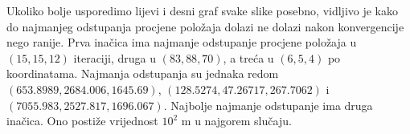 \documentclass[a4paper,twoside,12pt]{memoir} %
\begin{document}
Ukoliko bolje usporedimo lijevi i desni graf svake slike posebno, vidljivo je kako do najmanjeg odstupanja procjene položaja dolazi ne dolazi nakon konvergencije nego ranije.
Prva inačica ima najmanje odstupanje procjene položaja u $(15,15,12)$ iteraciji, druga u $(83,88,70)$, a treća u $(6,5,4)$ po koordinatama. Najmanja odstupanja su jednaka redom $(653.8989, 2684.006, 1645.69)$, $(128.5274,47.26717,267.7062)$ i $(7055.983,2527.817,1696.067)$.
Najbolje najmanje odstupanje ima druga inačica. Ono postiže vrijednost $10^2$ m u najgorem slučaju. 
\end{document}
